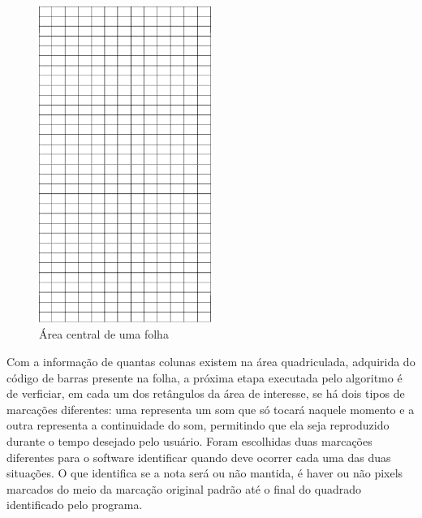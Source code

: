 \documentclass[12pt]{report}
\begin{document}
\begin{figure}[H]
  \centering
    \includegraphics[angle=90,origin=c,width=0.5\textwidth]{imagens/aoi.png}
    \caption{Área central de uma folha}
  \label{fig:aoi_aoi}
\end{figure}

Com a informação de quantas colunas existem na área quadriculada, adquirida do código de barras presente na folha, a próxima etapa executada pelo algoritmo é de verficiar, em cada um dos retângulos da área de interesse, se há dois tipos de marcações diferentes: uma representa um som que só tocará naquele momento e a outra representa a continuidade do som, permitindo que ela seja reproduzido durante o tempo desejado pelo usuário. Foram escolhidas duas marcações diferentes para o software identificar quando deve ocorrer cada uma das duas situações. O que identifica se a nota será ou não mantida, é haver ou não pixels marcados do meio da marcação original padrão até o final do quadrado identificado pelo programa.
\end{document}
